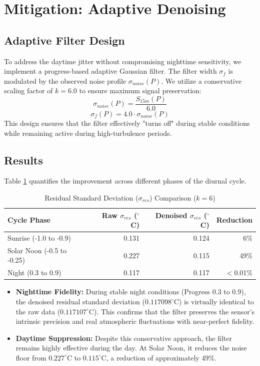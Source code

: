 \documentclass{article}
\begin{document}
\section{Mitigation: Adaptive Denoising}

\subsection{Adaptive Filter Design}
To address the daytime jitter without compromising nighttime sensitivity, we implement a progress-based adaptive Gaussian filter. The filter width $\sigma_f$ is modulated by the observed noise profile $\sigma_{noise}(P)$. We utilize a conservative scaling factor of $k=6.0$ to ensure maximum signal preservation:
\begin{equation}
    \sigma_{noise}(P) = \frac{S_{15m}(P)}{6.0}
\end{equation}
\begin{equation}
    \sigma_f(P) = 4.0 \cdot \sigma_{noise}(P)
\end{equation}
This design ensures that the filter effectively "turns off" during stable conditions while remaining active during high-turbulence periods.

\subsection{Results}
Table \ref{tab:results} quantifies the improvement across different phases of the diurnal cycle. 
\begin{table}[!htb]
\centering
\caption{Residual Standard Deviation ($\sigma_{res}$) Comparison ($k=6$)}
\label{tab:results}
\begin{tabular}{lrrr}
\toprule
Cycle Phase & Raw $\sigma_{res}$ ($^\circ$C) & Denoised $\sigma_{res}$ ($^\circ$C) & Reduction \\
\midrule
Sunrise (-1.0 to -0.9) & 0.131 & 0.124 & 6\% \\
Solar Noon (-0.5 to -0.25) & 0.227 & 0.115 & 49\% \\
Night (0.3 to 0.9) & 0.117 & 0.117 & $<$0.01\% \\
\bottomrule
\end{tabular}
\end{table}

\begin{itemize}
    \item \textbf{Nighttime Fidelity:} During stable night conditions (Progress 0.3 to 0.9), the denoised residual standard deviation ($0.117098^\circ$C) is virtually identical to the raw data ($0.117107^\circ$C). This confirms that the filter preserves the sensor's intrinsic precision and real atmospheric fluctuations with near-perfect fidelity.
    \item \textbf{Daytime Suppression:} Despite this conservative approach, the filter remains highly effective during the day. At Solar Noon, it reduces the noise floor from $0.227^\circ$C to $0.115^\circ$C, a reduction of approximately 49\%.
\end{itemize}
\end{document}
